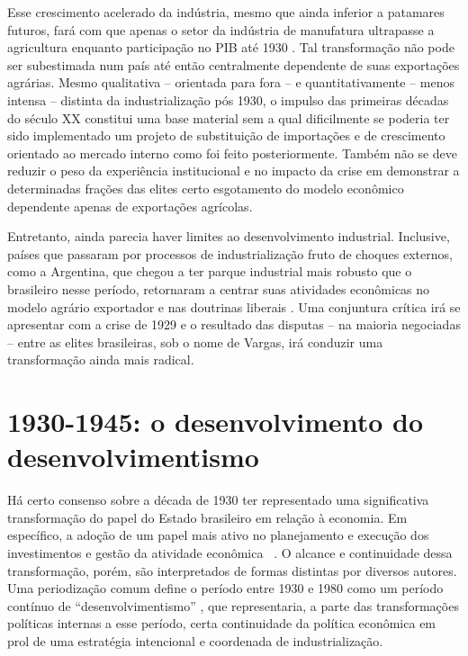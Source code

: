 Esse crescimento acelerado da indústria, mesmo que ainda inferior a
patamares futuros, fará com que apenas o setor da indústria de
manufatura ultrapasse a agricultura enquanto participação no PIB até
1930 \citep{suzigan2000}. Tal transformação não pode ser subestimada num país até então
centralmente dependente de suas exportações agrárias. Mesmo qualitativa
-- orientada para fora -- e quantitativamente -- menos intensa --
distinta da industrialização pós 1930, o impulso das primeiras décadas
do século XX constitui uma base material sem a qual dificilmente se
poderia ter sido implementado um projeto de substituição de importações
e de crescimento orientado ao mercado interno como foi feito
posteriormente. Também não se deve reduzir o peso da experiência
institucional e no impacto da crise em demonstrar a determinadas frações
das elites certo esgotamento do modelo econômico dependente apenas de
exportações agrícolas.

Entretanto, ainda parecia haver limites ao desenvolvimento industrial.
Inclusive, países que passaram por processos de industrialização fruto de
choques externos, como a Argentina, que chegou a ter parque industrial
mais robusto que o brasileiro nesse período, retornaram a centrar suas
atividades econômicas no modelo agrário exportador e nas doutrinas
liberais \citep{perissinotto_ideias_2023} . Uma conjuntura crítica irá se apresentar
com a crise de 1929 e o resultado das disputas -- na maioria
negociadas -- entre as elites brasileiras, sob o nome de Vargas, irá
conduzir uma transformação ainda mais radical.

\section{1930-1945: o desenvolvimento do desenvolvimentismo}\label{o-desenvolvimento-do-desenvolvimentismo}

Há certo consenso sobre a década de 1930 ter representado uma
significativa transformação do papel do Estado brasileiro em relação à
economia. Em específico, a adoção de um papel mais ativo no planejamento
e execução dos investimentos e gestão da atividade econômica
~\citep{suzigan2000,feijo_industrializacao_2023}. O alcance
e continuidade dessa transformação, porém, são interpretados de formas
distintas por diversos autores. Uma periodização comum define o período entre 1930 e 1980
como um período contínuo de ``desenvolvimentismo'' \citep{feijo_industrializacao_2023},
que representaria, a parte das transformações políticas internas a
esse período, certa continuidade da política econômica em prol de uma
estratégia intencional e coordenada de industrialização.

